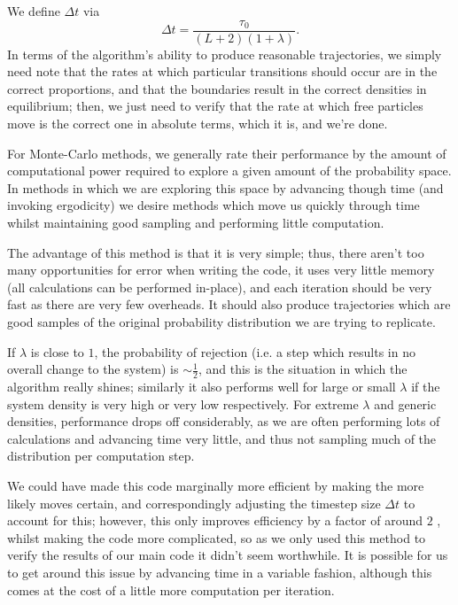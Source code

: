 We define $\Delta t$ via 
\begin{equation}
 \Delta t = \frac{\tau_0}{(L+2) (1+\lambda)}.
\end{equation}
In terms of the algorithm's ability to produce reasonable trajectories, we simply need note that
the rates at which particular transitions should occur are in the correct proportions, and that the boundaries result in the correct densities in equilibrium;
then, we just need
to verify that the rate at which free particles move is the correct one in absolute terms, which it is,
and we're done. 

For Monte-Carlo methods, we generally rate their performance by the amount of computational
power required to explore a given amount of the probability space. In methods in which we
are exploring this space by advancing though time (and invoking ergodicity) we desire methods
which move us quickly through time whilst maintaining good sampling and performing little computation.

The advantage of this method is that it is very simple; thus, there aren't too many opportunities
for error when writing the code, it uses very little memory (all calculations can be performed
in-place), and each iteration should be very fast as there are very few overheads. It should also
produce trajectories which are good samples of the original probability distribution we are 
trying to replicate.


If $\lambda$
is close to $1$, the probability of rejection (i.e. a step which results in no overall change to
the system) is $\sim\frac{1}{2}$, and this is the situation in which the algorithm really shines; similarly
it also performs well for large or small $\lambda$ if the system density is very high or very low
respectively. For extreme $\lambda$ and generic densities,
performance drops off considerably,
as
we are often performing lots of calculations and advancing time very little, and thus not sampling
much of the distribution per computation step.

We could have made this code marginally more efficient by making the more likely moves certain, and
correspondingly adjusting the timestep size $\Delta t$ to account for this; however, this only
improves efficiency by a factor of around $2$ , whilst making the code more complicated, so as
we only used this method to verify the results of our main code it didn't seem worthwhile.
It is possible for us to get
around this issue by advancing time in a variable fashion, although this comes at the cost of
a little more computation per iteration.

